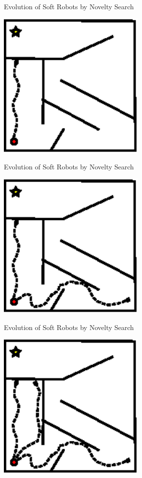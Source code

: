 \documentclass[6pt]{beamer}
\begin{document}
\begin{frame}{{\scriptsize Evolution of Soft Robots by} Novelty Search}
\begin{center}
\includegraphics[width=0.55\textwidth]{../Figures/Misc/maze1.eps}
\end{center}
\end{frame}

\begin{frame}{{\scriptsize Evolution of Soft Robots by} Novelty Search}
\begin{center}
\includegraphics[width=0.55\textwidth]{../Figures/Misc/maze2.eps}
\end{center}
\end{frame}

\begin{frame}{{\scriptsize Evolution of Soft Robots by} Novelty Search}
\begin{center}
\includegraphics[width=0.55\textwidth]{../Figures/Misc/maze3.eps}
\end{center}
\end{frame}
\end{document}
